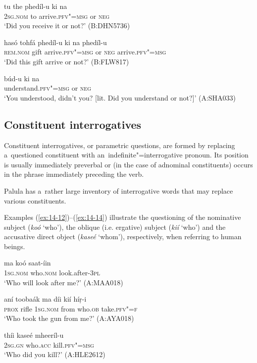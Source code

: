 \begin{exe}
\ex
\label{ex:14-9}
\gll tu the phedíl-u ki na \\
\textsc{2sg.nom} to arrive.\textsc{pfv"=msg} or \textsc{neg} \\
\glt `Did you receive it or not?' (B:DHN5736)

\ex
\label{ex:14-10}
\gll hasó tohfá phedíl-u ki na phedíl-u  \\
\textsc{rem.nom} gift arrive.\textsc{pfv"=msg} or \textsc{neg}  arrive.\textsc{pfv"=msg} \\
\glt `Did this gift arrive or not?' (B:FLW817)

\ex
\label{ex:14-11}
\gll búd-u ki na \\
understand.\textsc{pfv"=msg} or \textsc{neg} \\
\glt `You understood, didn't you? [lit. Did you understand or not?]' (A:SHA033)
\end{exe}
\subsection{Constituent interrogatives}
\label{subsec:14-2-2}

Constituent interrogatives, or parametric questions, are formed by replacing a~questioned constituent with an~indefinite"=interrogative pronoun. Its position is usually immediately preverbal or (in the case of adnominal constituents) occurs in the phrase immediately preceding the verb.


Palula has a~rather large inventory of interrogative words that may replace various constituents.


 Examples (\ref{ex:14-12})--(\ref{ex:14-14}) illustrate the questioning of the nominative subject (\textit{koó} `who'), the oblique (i.e. ergative) subject (\textit{kií} `who') and the accusative direct object (\textit{kaseé} `whom'), respectively, when referring to human beings.

\begin{exe}
\ex
\label{ex:14-12}
\gll ma koó saat-íin \\
\textsc{1sg}.\textsc{nom} who.\textsc{nom} look.after-\textsc{3pl} \\
\glt `Who will look after me?' (A:MAA018)

\ex
\label{ex:14-13}
\gll aní toobaák ma díi kií híṛ-i\\
\textsc{prox} rifle \textsc{1sg.nom} from who.\textsc{ob} take.\textsc{pfv"=f} \\
\glt `Who took the gun from me?' (A:AYA018)

\ex
\label{ex:14-14}
\gll thíi kaseé mheeríl-u \\
\textsc{2sg.gn} who.\textsc{acc} kill.\textsc{pfv"=msg} \\
\glt `Who did you kill?' (A:HLE2612)
\end{exe}

